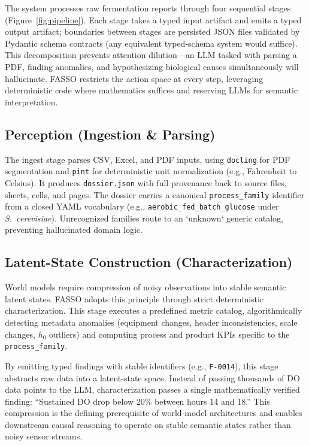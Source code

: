 \documentclass[11pt]{article}
\begin{document}
The system processes raw fermentation reports through four sequential stages (Figure~\ref{fig:pipeline}). Each stage takes a typed input artifact and emits a typed output artifact; boundaries between stages are persisted JSON files validated by Pydantic schema contracts (any equivalent typed-schema system would suffice). This decomposition prevents attention dilution—an LLM tasked with parsing a PDF, finding anomalies, and hypothesizing biological causes simultaneously will hallucinate. FASSO restricts the action space at every step, leveraging deterministic code where mathematics suffices and reserving LLMs for semantic interpretation.

\subsection{Perception (Ingestion \& Parsing)}

The ingest stage parses CSV, Excel, and PDF inputs, using \texttt{docling} for PDF segmentation and \texttt{pint} for deterministic unit normalization (e.g., Fahrenheit to Celsius). It produces \texttt{dossier.json} with full provenance back to source files, sheets, cells, and pages. The dossier carries a canonical \texttt{process\_family} identifier from a closed YAML vocabulary (e.g., \texttt{aerobic\_fed\_batch\_glucose} under \emph{S.\ cerevisiae}). Unrecognized families route to an `unknown` generic catalog, preventing hallucinated domain logic.

\subsection{Latent-State Construction (Characterization)}

World models require compression of noisy observations into stable semantic latent states. FASSO adopts this principle through strict deterministic characterization. This stage executes a predefined metric catalog, algorithmically detecting metadata anomalies (equipment changes, header inconsistencies, scale changes, $h_0$ outliers) and computing process and product KPIs specific to the \texttt{process\_family}.

By emitting typed findings with stable identifiers (e.g., \texttt{F-0014}), this stage abstracts raw data into a latent-state space. Instead of passing thousands of DO data points to the LLM, characterization passes a single mathematically verified finding: ``Sustained DO drop below 20\% between hours 14 and 18.'' This compression is the defining prerequisite of world-model architectures and enables downstream causal reasoning to operate on stable semantic states rather than noisy sensor streams.
\end{document}
